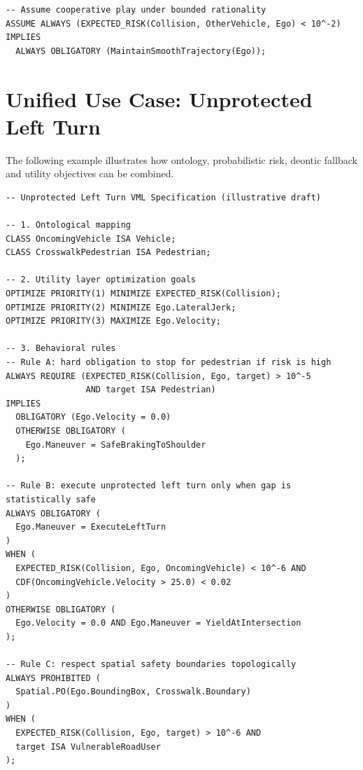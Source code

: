 \documentclass[11pt,a4paper]{article}
\begin{document}
\begin{verbatim}
-- Assume cooperative play under bounded rationality
ASSUME ALWAYS (EXPECTED_RISK(Collision, OtherVehicle, Ego) < 10^-2)
IMPLIES
  ALWAYS OBLIGATORY (MaintainSmoothTrajectory(Ego));
\end{verbatim}

\section{Unified Use Case: Unprotected Left Turn}
The following example illustrates how ontology, probabilistic risk, deontic fallback and utility objectives can be combined.

\begin{verbatim}
-- Unprotected Left Turn VML Specification (illustrative draft)

-- 1. Ontological mapping
CLASS OncomingVehicle ISA Vehicle;
CLASS CrosswalkPedestrian ISA Pedestrian;

-- 2. Utility layer optimization goals
OPTIMIZE PRIORITY(1) MINIMIZE EXPECTED_RISK(Collision);
OPTIMIZE PRIORITY(2) MINIMIZE Ego.LateralJerk;
OPTIMIZE PRIORITY(3) MAXIMIZE Ego.Velocity;

-- 3. Behavioral rules
-- Rule A: hard obligation to stop for pedestrian if risk is high
ALWAYS REQUIRE (EXPECTED_RISK(Collision, Ego, target) > 10^-5
                AND target ISA Pedestrian)
IMPLIES
  OBLIGATORY (Ego.Velocity = 0.0)
  OTHERWISE OBLIGATORY (
    Ego.Maneuver = SafeBrakingToShoulder
  );

-- Rule B: execute unprotected left turn only when gap is statistically safe
ALWAYS OBLIGATORY (
  Ego.Maneuver = ExecuteLeftTurn
)
WHEN (
  EXPECTED_RISK(Collision, Ego, OncomingVehicle) < 10^-6 AND
  CDF(OncomingVehicle.Velocity > 25.0) < 0.02
)
OTHERWISE OBLIGATORY (
  Ego.Velocity = 0.0 AND Ego.Maneuver = YieldAtIntersection
);

-- Rule C: respect spatial safety boundaries topologically
ALWAYS PROHIBITED (
  Spatial.PO(Ego.BoundingBox, Crosswalk.Boundary)
)
WHEN (
  EXPECTED_RISK(Collision, Ego, target) > 10^-6 AND
  target ISA VulnerableRoadUser
);
\end{verbatim}
\end{document}
